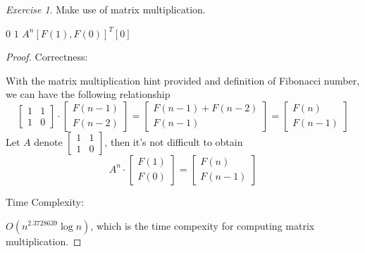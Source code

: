 \documentclass[a4paper,10pt,twoside]{article}
\theoremstyle{plain}
\theoremstyle{definition}
\theoremstyle{remark}
\newtheorem{exercise}{Exercise}
\begin{document}
\begin{exercise}
Make use of matrix multiplication.
\begin{algorithm}[h]
	\caption{$Fib(n)$}
		{\Return $0$}
		{\Return $1$}
		{\Return $A^n [F(1), F(0)]^T[0]$}
\end{algorithm}

\begin{proof}
Correctness: 

With the matrix multiplication hint provided and definition of Fibonacci number, we can have the following relationship
\begin{equation}
	\begin{bmatrix}1 & 1\\ 1 & 0\end{bmatrix}\cdot
	\begin{bmatrix}F(n-1)\\F(n-2)\end{bmatrix}
	= \begin{bmatrix}F(n-1) + F(n-2)\\F(n-1)\end{bmatrix}
	= \begin{bmatrix}F(n)\\F(n-1)\end{bmatrix}
\end{equation}
Let $A$  denote $\begin{bmatrix}1 & 1\\ 1 & 0\end{bmatrix}$, then it's not difficult to obtain 
 \begin{equation}
	A^n \cdot \begin{bmatrix}F(1)\\F(0)\end{bmatrix} = \begin{bmatrix}F(n)\\F(n-1)\end{bmatrix}
\end{equation}

Time Complexity:

$O(n^{2.3728639}\log n)$, which is the time compexity for computing matrix multiplication.
\end{proof}
\end{exercise}
\end{document}
